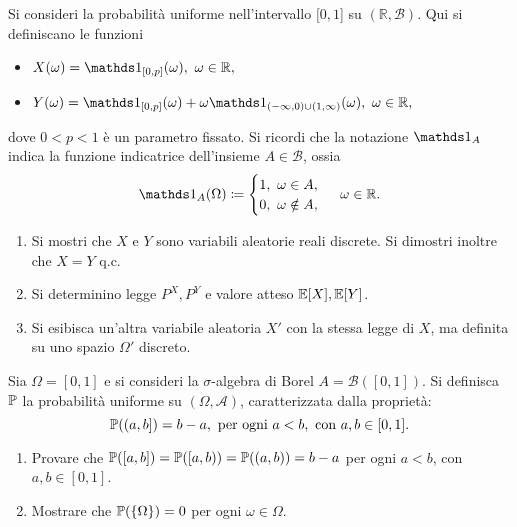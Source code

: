 
Si consideri la probabilità uniforme nell'intervallo $[0,1$] su $(\mathbb{R} ,\mathcal{B})$. Qui si definiscano le funzioni
\begin{itemize}
\item $X(\omega) =\Ind_{[0,p]}(\omega) ,\ \omega \in \mathbb{R} ,$
\item $Y(\omega) =\Ind_{[0,p]}(\omega) +\omega \Ind_{(-\infty ,0) \cup (1,\infty)}(\omega) ,\ \omega \in \mathbb{R} ,$
\end{itemize}

dove $0< p< 1$ è un parametro fissato. Si ricordi che la notazione $\Ind_{A}$ indica la funzione indicatrice dell'insieme $A\in \mathcal{B}$, ossia
\begin{equation*}
\Ind_{A}(\Omega) \coloneqq
\begin{cases}
1,\ \omega \in A,\\
0,\ \omega \notin A,
\end{cases}
\ \omega \in \mathbb{R} .
\end{equation*}
\begin{enumerate}
\item Si mostri che $X$ e $Y$ sono variabili aleatorie reali discrete. Si dimostri inoltre che $X=Y$ q.c.
\item Si determinino legge $P^{X} ,P^{Y}$ e valore atteso $\mathbb{E}[X] ,\mathbb{E}[Y]$.
\item Si esibisca un'altra variabile aleatoria $X' $ con la stessa legge di $X$, ma definita su uno spazio $\Omega ' $ discreto.
\end{enumerate}

\Esercizio{}

Sia $\Omega =[0,1]$ e si consideri la $\sigma $-algebra di Borel $A=\mathcal{B}([0,1])$. Si definisca $\mathbb{P}$ la probabilità uniforme su $(\Omega ,\mathcal{A})$, caratterizzata dalla proprietà:
\begin{equation*}
\mathbb{P}((a,b]) =b-a,\ \text{per ogni} \ a< b,\ \text{con} \ a,b\in [0,1] .
\end{equation*}
\begin{enumerate}
\item Provare che $\mathbb{P}([a,b]) =\mathbb{P}([a,b)) =\mathbb{P}((a,b)) =b-a$ per ogni $a< b$, con $a,b\in [0,1]$.
\item Mostrare che $\mathbb{P}(\{\Omega \}) =0$ per ogni $\omega \in \Omega $.
\end{enumerate}


